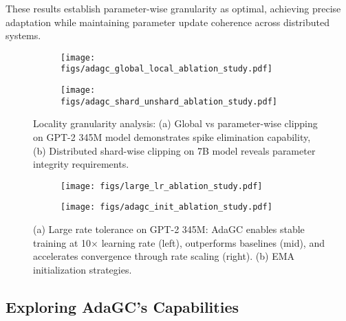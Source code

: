These results establish parameter-wise granularity as optimal, achieving precise adaptation while maintaining parameter update coherence across distributed systems.




\begin{figure}[!t]
    \vskip 0.1in
    \centering
    \begin{subfigure}{0.495\columnwidth}
        \texttt{[image: figs/adagc\_global\_local\_ablation\_study.pdf]}
        \caption{}
        \label{fig:gpt345m_global_vs_tensorwise_adagc}
    \end{subfigure} \hfill
    \begin{subfigure}{0.495\columnwidth}
        \texttt{[image: figs/adagc\_shard\_unshard\_ablation\_study.pdf]}
        \caption{}
        \label{fig:llama7b_tensorwise_vs_shard_tensorwise_adagc}
    \end{subfigure}
    \caption{Locality granularity analysis: (a) Global vs parameter-wise clipping on GPT-2 345M model demonstrates spike elimination capability, (b) Distributed shard-wise clipping on 7B model reveals parameter integrity requirements.}
    \label{fig:enter-label}
    \vskip -0.2in
\end{figure}

\begin{figure*}[!t]
    \vskip 0.1in
    \centering
    \begin{subfigure}{0.745\textwidth}
        \texttt{[image: figs/large\_lr\_ablation\_study.pdf]}
        \caption{}
        \label{fig:large_lr}
    \end{subfigure} \hfill
    \begin{subfigure}{0.25\textwidth}
        \texttt{[image: figs/adagc\_init\_ablation\_study.pdf]}
        \caption{}
        \label{fig:init_method}
    \end{subfigure}
    \vspace{-7mm}
    \caption{(a) Large rate tolerance on GPT-2 345M: AdaGC enables stable training at 10$\times$ learning rate (left), outperforms baselines (mid), and accelerates convergence through rate scaling (right). (b) EMA initialization strategies.}
    \label{}
    \vskip -0.2in
\end{figure*}




\subsection{Exploring AdaGC's Capabilities}
\label{sec:capabilities}


